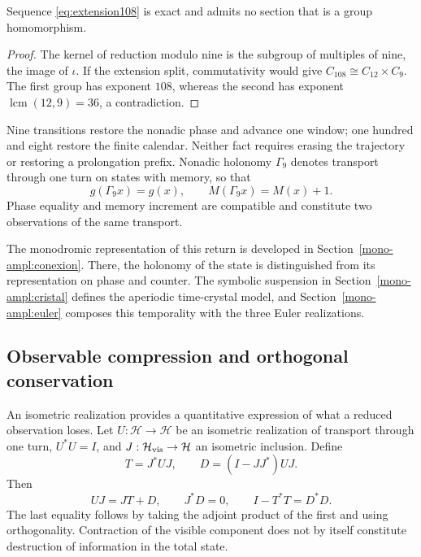 \begin{proposition}
Sequence \eqref{eq:extension108} is exact and admits no section that is a group homomorphism.
\end{proposition}
\begin{proof}
The kernel of reduction modulo nine is the subgroup of multiples of nine, the image of \(\iota\). If the extension split, commutativity would give \(C_{108}\cong C_{12}\times C_9\). The first group has exponent \(108\), whereas the second has exponent \(\operatorname{lcm}(12,9)=36\), a contradiction.
\end{proof}

Nine transitions restore the nonadic phase and advance one window; one hundred and eight restore the finite calendar. Neither fact requires erasing the trajectory or restoring a prolongation prefix. Nonadic holonomy \(\Gamma_9\) denotes transport through one turn on states with memory, so that
\begin{equation}
 g(\Gamma_9x)=g(x),\qquad M(\Gamma_9x)=M(x)+1.
 \label{eq:holonomia-memoria}
\end{equation}
Phase equality and memory increment are compatible and constitute two observations of the same transport.



The monodromic representation of this return is developed in
Section~\ref{mono-ampl:conexion}. There, the holonomy of the state
is distinguished from its representation on phase and counter. The
symbolic suspension in Section~\ref{mono-ampl:cristal} defines the
aperiodic time-crystal model, and Section~\ref{mono-ampl:euler}
composes this temporality with the three Euler realizations.

\subsection{Observable compression and orthogonal conservation}

An isometric realization provides a quantitative expression of what a reduced observation loses. Let \(U:\mathcal H\to\mathcal H\) be an isometric realization of transport through one turn, \(U^*U=I\), and \(J:\mathcal H_{\rm vis}\to\mathcal H\) an isometric inclusion. Define
\[
 T=J^*UJ,\qquad D=(I-JJ^*)UJ.
\]
Then
\begin{equation}
 UJ=JT+D,\qquad J^*D=0,\qquad I-T^*T=D^*D.
 \label{eq:conservacion-ortogonal}
\end{equation}
The last equality follows by taking the adjoint product of the first and using orthogonality. Contraction of the visible component does not by itself constitute destruction of information in the total state.

